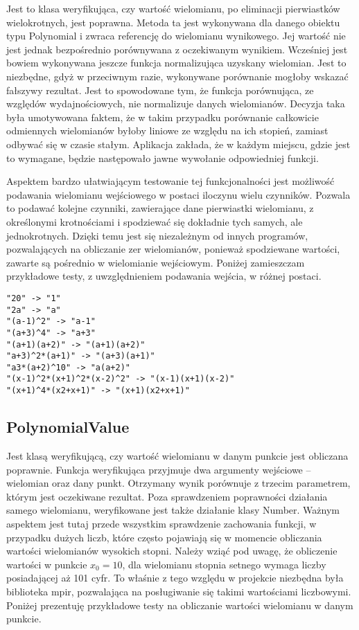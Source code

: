 \documentclass[twoside,a4paper]{book}
\begin{document}
Jest to klasa weryfikująca, czy wartość wielomianu, po eliminacji pierwiastków wielokrotnych, jest poprawna. Metoda ta jest wykonywana dla danego obiektu typu Polynomial i zwraca referencję do wielomianu wynikowego. Jej wartość nie jest jednak bezpośrednio porównywana z oczekiwanym wynikiem. Wcześniej jest bowiem wykonywana jeszcze funkcja normalizująca uzyskany wielomian. Jest to niezbędne, gdyż w przeciwnym razie, wykonywane porównanie mogłoby wskazać fałszywy rezultat. Jest to spowodowane tym, że funkcja porównująca, ze względów wydajnościowych, nie normalizuje danych wielomianów. Decyzja taka była umotywowana faktem, że w takim przypadku porównanie całkowicie odmiennych wielomianów byłoby liniowe ze względu na ich stopień, zamiast odbywać się w czasie stałym. Aplikacja zakłada, że w każdym miejscu, gdzie jest to wymagane, będzie następowało jawne wywołanie odpowiedniej funkcji.

Aspektem bardzo ułatwiającym testowanie tej funkcjonalności jest możliwość podawania wielomianu wejściowego w postaci iloczynu wielu czynników. Pozwala to podawać kolejne czynniki, zawierające dane pierwiastki wielomianu, z określonymi krotnościami i spodziewać się dokładnie tych samych, ale jednokrotnych. Dzięki temu jest się niezależnym od innych programów, pozwalających na obliczanie zer wielomianów, ponieważ spodziewane wartości, zawarte są pośrednio w wielomianie wejściowym. Poniżej zamieszczam przykładowe testy, z uwzględnieniem podawania wejścia, w różnej postaci.

\begin{lstlisting}
"20" -> "1"
"2a" -> "a"
"(a-1)^2" -> "a-1"
"(a+3)^4" -> "a+3"
"(a+1)(a+2)" -> "(a+1)(a+2)"
"a+3)^2*(a+1)" -> "(a+3)(a+1)"
"a3*(a+2)^10" -> "a(a+2)"
"(x-1)^2*(x+1)^2*(x-2)^2" -> "(x-1)(x+1)(x-2)"
"(x+1)^4*(x2+x+1)" -> "(x+1)(x2+x+1)"
\end{lstlisting}

\subsection{PolynomialValue}

Jest klasą weryfikującą, czy wartość wielomianu w danym punkcie jest obliczana poprawnie. Funkcja weryfikująca przyjmuje dwa argumenty wejściowe – wielomian oraz dany punkt. Otrzymany wynik porównuje z trzecim parametrem, którym jest oczekiwane rezultat. Poza sprawdzeniem poprawności działania samego wielomianu, weryfikowane jest także działanie klasy Number. Ważnym aspektem jest tutaj przede wszystkim sprawdzenie zachowania funkcji, w przypadku dużych liczb, które często pojawiają się w momencie obliczania wartości wielomianów wysokich stopni. Należy wziąć pod uwagę, że obliczenie wartości w punkcie $x_0=10$, dla wielomianu stopnia setnego wymaga liczby posiadającej aż 101 cyfr. To właśnie z tego względu w projekcie niezbędna była biblioteka mpir, pozwalająca na posługiwanie się takimi wartościami liczbowymi. Poniżej prezentuję przykładowe testy na obliczanie wartości wielomianu w danym punkcie.
\end{document}
